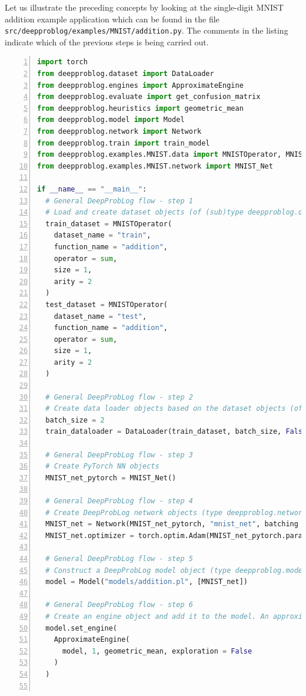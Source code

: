 Let us illustrate the preceding concepts by looking at the single-digit MNIST addition example application which can be found in the file \texttt{src/deepproblog/examples/MNIST/addition.py}. The comments in the listing indicate which of the previous steps is being carried out.
\begin{lstlisting}[language=Python, caption={src/deepproblog/examples/MNIST/basic_addition.py, the basic MNIST single-digit addition example}, numbers=left, label={lst:MNIST_addition_source_code}, captionpos=b]
import torch
from deepproblog.dataset import DataLoader
from deepproblog.engines import ApproximateEngine
from deepproblog.evaluate import get_confusion_matrix
from deepproblog.heuristics import geometric_mean
from deepproblog.model import Model
from deepproblog.network import Network
from deepproblog.train import train_model
from deepproblog.examples.MNIST.data import MNISTOperator, MNIST_train, MNIST_test
from deepproblog.examples.MNIST.network import MNIST_Net
  
if __name__ == "__main__":
  # General DeepProbLog flow - step 1
  # Load and create dataset objects (of (sub)type deepproblog.dataset.Dataset)
  train_dataset = MNISTOperator(
    dataset_name = "train",
    function_name = "addition",
    operator = sum,
    size = 1,
    arity = 2
  )
  test_dataset = MNISTOperator(
    dataset_name = "test",
    function_name = "addition",
    operator = sum,
    size = 1,
    arity = 2
  )
  
  # General DeepProbLog flow - step 2
  # Create data loader objects based on the dataset objects (of (sub)type deepproblog.dataset.DataLoader)
  batch_size = 2
  train_dataloader = DataLoader(train_dataset, batch_size, False)
  
  # General DeepProbLog flow - step 3
  # Create PyTorch NN objects
  MNIST_net_pytorch = MNIST_Net()
  
  # General DeepProbLog flow - step 4
  # Create DeepProbLog network objects (type deepproblog.network.Network) based on the PyTorch NNs
  MNIST_net = Network(MNIST_net_pytorch, "mnist_net", batching = True)
  MNIST_net.optimizer = torch.optim.Adam(MNIST_net_pytorch.parameters(), lr = 1e-3)
  
  # General DeepProbLog flow - step 5
  # Construct a DeepProbLog model object (type deepproblog.model.Model) based on the KB file and the DeepProbLog Network objects
  model = Model("models/addition.pl", [MNIST_net])
  
  # General DeepProbLog flow - step 6
  # Create an engine object and add it to the model. An approximate (class deepproblog.engines.ApproximateEngine) and exact (deepproblog.engines.ExactEngine) inference engine are provided in the standard DeepProbLog distribution. Both engines have cases in which they are or are not appropriate.
  model.set_engine(
    ApproximateEngine(
      model, 1, geometric_mean, exploration = False
    )
  )
  

\end{lstlisting}
